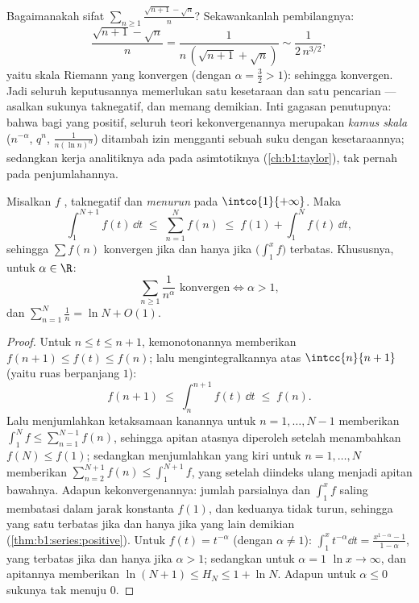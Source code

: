 \begin{example}\label{ex:b1:series:equivtest}
Bagaimanakah sifat $\sum_{n \geq 1} \frac{\sqrt{n+1} - \sqrt n}{n}$?
Sekawankanlah pembilangnya:
\[
\frac{\sqrt{n+1} - \sqrt n}{n}
= \frac{1}{n\,(\sqrt{n+1} + \sqrt n)}
\sim \frac{1}{2\,n^{3/2}} ,
\]
yaitu skala Riemann yang konvergen (dengan $\alpha = \frac32 > 1$): sehingga 
konvergen. Jadi seluruh keputusannya memerlukan satu kesetaraan dan satu pencarian
--- asalkan sukunya taknegatif, dan memang demikian. Inti
gagasan penutupnya: bahwa bagi  yang positif, seluruh teori
kekonvergenannya merupakan \emph{kamus skala} ($n^{-\alpha}$, $q^n$,
$\frac{1}{n(\ln n)^\alpha}$) ditambah izin mengganti sebuah suku
dengan kesetaraannya; sedangkan kerja analitiknya ada pada asimtotiknya
(\cref{ch:b1:taylor}), tak pernah pada penjumlahannya.
\end{example}

\begin{theorem}\label{thm:b1:series:riemann}
Misalkan $f$ , taknegatif dan \emph{menurun} pada
$\intco{1}{+\infty}$. Maka
\[
\int_1^{N+1} f(t)\,\dd t \;\leq\; \sum_{n=1}^{N} f(n) \;\leq\; f(1)
+ \int_1^{N} f(t)\,\dd t ,
\]
sehingga $\sum f(n)$ konvergen jika dan hanya jika $\bigl(\int_1^x f\bigr)$ terbatas.
Khususnya, untuk $\alpha \in \R$:
\[
\sum_{n \geq 1} \frac{1}{n^\alpha} \text{ konvergen}
\iff \alpha > 1,
\]
dan $\sum_{n=1}^{N} \frac1n = \ln N + O(1)$.
\end{theorem}

\begin{proof}
Untuk $n \leq t \leq n+1$, kemonotonannya memberikan $f(n+1) \leq f(t)
\leq f(n)$; lalu mengintegralkannya atas $\intcc{n}{n+1}$ (yaitu ruas
berpanjang $1$):
\[
f(n+1) \;\leq\; \int_n^{n+1} f(t)\,\dd t \;\leq\; f(n) .
\]
Lalu menjumlahkan ketaksamaan kanannya untuk $n = 1, \dots, N-1$ memberikan
$\int_1^{N} f \leq \sum_{n=1}^{N-1} f(n)$, sehingga apitan atasnya diperoleh
setelah menambahkan $f(N) \leq f(1)$; sedangkan menjumlahkan yang kiri untuk
$n = 1, \dots, N$ memberikan $\sum_{n=2}^{N+1} f(n) \leq
\int_1^{N+1} f$, yang setelah diindeks ulang menjadi apitan bawahnya.
Adapun kekonvergenannya: jumlah parsialnya dan  $\int_1^x f$
saling membatasi dalam jarak konstanta $f(1)$, dan keduanya
tidak turun, sehingga yang satu terbatas jika dan hanya jika yang lain demikian
(\cref{thm:b1:series:positive}). Untuk $f(t)
= t^{-\alpha}$ (dengan $\alpha \neq 1$): $\int_1^x t^{-\alpha}\dd t =
\frac{x^{1-\alpha} - 1}{1 - \alpha}$, yang terbatas jika dan hanya jika $\alpha > 1$; sedangkan untuk
$\alpha = 1$  $\ln x \to \infty$, dan apitannya
memberikan $\ln(N+1) \leq H_N \leq 1 + \ln N$. Adapun untuk $\alpha \leq 0$
sukunya tak menuju $0$.
\end{proof}


